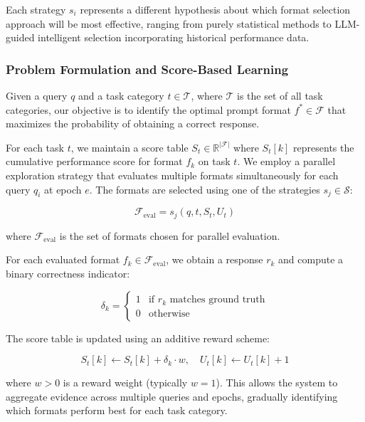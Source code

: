Each strategy $s_i$ represents a different hypothesis about which format selection approach will be most effective, ranging from purely statistical methods to LLM-guided intelligent selection incorporating historical performance data.

\subsubsection{Problem Formulation and Score-Based Learning}

Given a query $q$ and a task category $t \in \mathcal{T}$, where $\mathcal{T}$ is the set of all task categories, our objective is to identify the optimal prompt format $f^* \in \mathcal{F}$ that maximizes the probability of obtaining a correct response.

For each task $t$, we maintain a score table $S_t \in \mathbb{R}^{|\mathcal{F}|}$ where $S_t[k]$ represents the cumulative performance score for format $f_k$ on task $t$. We employ a parallel exploration strategy that evaluates multiple formats simultaneously for each query $q_i$ at epoch $e$. The formats are selected using one of the strategies $s_j \in \mathcal{S}$:

\begin{equation}
\mathcal{F}_{\text{eval}} = s_j(q, t, S_t, U_t)
\end{equation}

where $\mathcal{F}_{\text{eval}}$ is the set of formats chosen for parallel evaluation.

For each evaluated format $f_k \in \mathcal{F}_{\text{eval}}$, we obtain a response $r_k$ and compute a binary correctness indicator:

\begin{equation}
\delta_k = \begin{cases}
1 & \text{if } r_k \text{ matches ground truth} \\
0 & \text{otherwise}
\end{cases}
\end{equation}

The score table is updated using an additive reward scheme:

\begin{equation}
S_t[k] \leftarrow S_t[k] + \delta_k \cdot w, \quad U_t[k] \leftarrow U_t[k] + 1
\end{equation}

where $w > 0$ is a reward weight (typically $w = 1$). This allows the system to aggregate evidence across multiple queries and epochs, gradually identifying which formats perform best for each task category.

